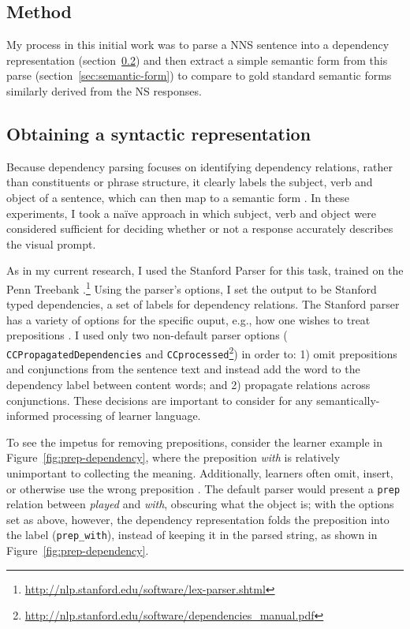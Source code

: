 \subsection{Method}
\label{sec:method}

My process in this initial work was to parse a NNS sentence into a dependency representation
(section~\ref{sec:syntactic-form})
and then extract a simple semantic
form from this parse
(section~\ref{sec:semantic-form})
to compare to
gold standard semantic forms similarly derived from the NS responses.

\subsection{Obtaining a syntactic representation}
\label{sec:syntactic-form}
Because dependency parsing focuses on identifying dependency
relations, rather than constituents or phrase structure, it clearly
labels the subject, verb and object of a sentence, which can then map
to a semantic form \citep{Kuebler.McDonald.Nivre-09}. In these experiments, I took a na\"ive approach in which subject, verb and
object were considered sufficient for deciding whether or not a
response accurately describes the visual prompt.

As in my current research, I used the Stanford Parser for this task, trained on the Penn Treebank 
\citep{demarneffe:ea:06, 
klein:manning:03}.\footnote{\url{http://nlp.stanford.edu/software/lex-parser.shtml}} 
%
Using the parser's options, I set the output to be Stanford typed
dependencies, a set of labels for dependency relations. The Stanford
parser has a variety of options for the specific
ouput, e.g., how one wishes to treat prepositions
\citep{defmarneffe:manning:12}.  I used only two non-default parser options ({\tt
  CCPropagatedDependencies} and {\tt CCprocessed}\footnote{\url{http://nlp.stanford.edu/software/dependencies_manual.pdf}}) in order to:
%
1) omit prepositions and conjunctions from the sentence text and
instead add the word to the dependency label between content words;
and 2) propagate relations across conjunctions.  These decisions
are important to consider for any semantically-informed processing of
learner language.

To see the impetus for removing prepositions, consider the learner
example in Figure~\ref{fig:prep-dependency}, where the preposition \textit{with} is
relatively unimportant to collecting the meaning.  Additionally,
learners often omit, insert, or otherwise use the wrong preposition
\citep{chodorow:et:al:07}.  The default parser would present a
\texttt{prep} relation between \textit{played} and \textit{with},
obscuring what the object is; with the options set as above, however,
the dependency representation folds the preposition into the label
(\texttt{prep\_with}), instead of keeping it in the parsed string, as
shown in Figure~\ref{fig:prep-dependency}.

